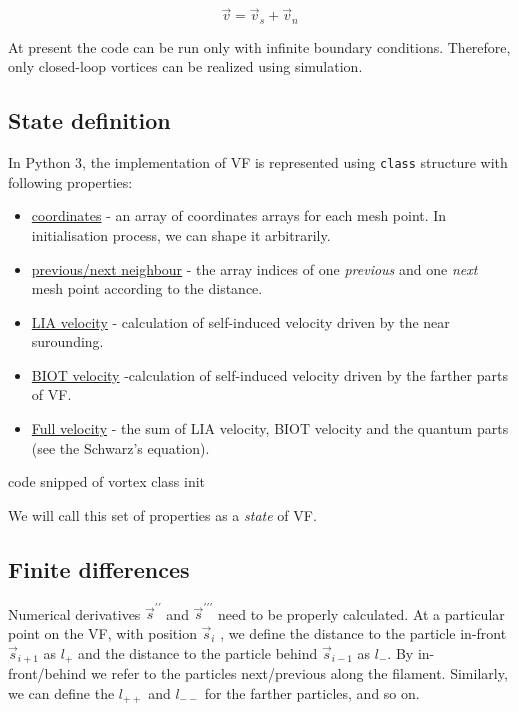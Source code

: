 \begin{equation}
\vec{v} = \vec{v}_s + \vec{v}_n
\end{equation}

At present the code can be run only with infinite boundary conditions. Therefore, only closed-loop vortices can be realized using simulation.

\subsection*{State definition}

In Python 3, the implementation of VF is represented using \texttt{class} structure with following properties:

\begin{itemize}
	\item \underline{coordinates} - an array of coordinates arrays for each mesh point. In initialisation process, we can shape it arbitrarily.
	\item \underline{previous/next neighbour} - the array indices of one \textit{previous} and one \textit{next} mesh point according to the distance.
	\item \underline{LIA velocity} - calculation of self-induced velocity driven by the near surounding.
	\item \underline{BIOT velocity} -calculation of self-induced velocity driven by the farther parts of VF.
	\item \underline{Full velocity} - the sum of LIA velocity, BIOT velocity and the quantum parts (see the Schwarz's equation).
\end{itemize}

\todo code snipped of vortex class init

We will call this set of properties as a \textit{state} of VF.

\subsection{Finite differences}

Numerical derivatives $\vec{s}^{\prime\prime}$ and $\vec{s}^{\prime\prime\prime}$ need to be properly calculated. At a particular point on the VF, with position $\vec{s}_i$ , we define the distance to the particle in-front $\vec{s}_{i+1}$ as
$l_{+}$ and the distance to the particle behind $\vec{s}_{i-1}$ as $l_{-}$. By in-front/behind we refer to the particles next/previous
along the filament. Similarly, we can define the $l_{++}$ and $l_{--}$ for the farther particles, and so on.

